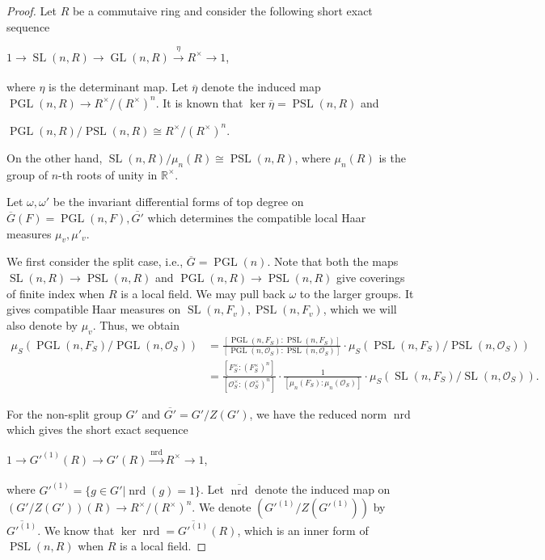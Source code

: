 \documentclass[10pt,a4paper]{amsart}
\DeclareMathOperator{\GL}{GL}
\DeclareMathOperator{\PGL}{PGL}
\DeclareMathOperator{\PSL}{PSL}
\DeclareMathOperator{\SL}{SL}
\DeclareMathOperator{\nrd}{nrd}
\begin{document}
\begin{proof}
Let $R$ be a commutaive ring and consider the following short exact sequence
\begin{center}
    $1\xrightarrow[]{} \SL(n,R)\xrightarrow[]{}\GL(n,R)\xrightarrow[]{\eta}  R^{\times}\to 1$,
\end{center}
where $\eta$ is the determinant map. 
Let $\overline{\eta}$ denote the induced map $\PGL(n,R)\to R^{\times}/(R^{\times})^{n}$. 
It is known that $\ker \overline{\eta}=\PSL(n,R)$ and
\begin{center}
    $\PGL(n,R)/\PSL(n,R)\cong R^{\times}/(R^{\times})^{n}$. 
\end{center}
On the other hand, $\SL(n,R)/\mu_n(R)\cong \PSL(n,R)$, where $\mu_{n}(R)$ is the group of $n$-th roots of unity in $\mathbb{R}^{\times}$.

Let $\omega,\omega'$ be the invariant differential forms of top degree on $\overline{G}(F)=\PGL(n,F),\overline{G'}$ which determines the compatible local Haar measures $\mu_v,\mu'_{v}$. 

We first consider the split case, i.e., $\overline{G}=\PGL(n)$. 
Note that both the maps $\SL(n,R)\to \PSL(n,R)$ and $\PGL(n,R)\to \PSL(n,R)$ give coverings of finite index when $R$ is a local field. 
We may pull back $\omega$ to the larger groups. It gives compatible Haar measures on $\SL(n,F_v),\PSL(n,F_v)$, which we will also denote by $\mu_{v}$.
Thus, we obtain
\begin{equation}\label{ePGL-SL}
\begin{aligned}
    \mu_{S}(\PGL(n,F_S)/\PGL(n,\mathcal{O}_S))&=\frac{[\PGL(n,F_S):\PSL(n,F_S)]}{[\PGL(n,\mathcal{O}_S):\PSL(n,\mathcal{O}_S)]}\cdot \mu_{S}(\PSL(n,F_S)/\PSL(n,\mathcal{O}_S))\\
    &=\frac{[F_S^{\times}:(F_S^{\times})^n]}{[\mathcal{O}_S^{\times}:(\mathcal{O}_S^{\times})^n]}\cdot \frac{1}{[\mu_n(F_S):\mu_n(\mathcal{O}_S)]}\cdot \mu_{S}(\SL(n,F_S)/\SL(n,\mathcal{O}_S)). 
\end{aligned}
\end{equation}

For the non-split group $G'$ and $\overline{G'}=G'/Z(G')$, we have the reduced norm $\nrd$ which gives the short exact sequence
\begin{center}
    $1\xrightarrow[]{} G'^{(1)}(R)\xrightarrow[]{}G'(R)\xrightarrow[]{\nrd}  R^{\times}\to 1$,
\end{center}
where $G'^{(1)}=\{g\in G'|\nrd(g)=1\}$. 
Let $\overline{\nrd}$ denote the induced map on $(G'/Z(G'))(R)\to R^{\times}/(R^{\times})^{n}$.
We denote $(G'^{(1)}/Z(G'^{(1)}))$ by $\overline{G'^{(1)}}$. 
We know that $\ker\nrd=\overline{G'^{(1)}}(R)$, which is an inner form of $\PSL(n,R)$ when $R$ is a local field. 



\end{proof}
\end{document}
